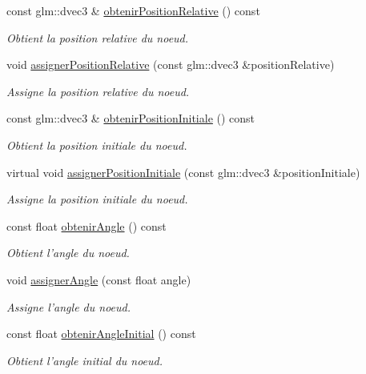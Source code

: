 \begin{DoxyCompactItemize}
const glm\-::dvec3 \& \hyperlink{group__inf2990_ga62d73f67c3b33e2cb106630bd1736a58}{obtenir\-Position\-Relative} () const 
\begin{DoxyCompactList}\small\item\em Obtient la position relative du noeud. \end{DoxyCompactList}\item 
void \hyperlink{group__inf2990_ga11e12e42b05a5327c92cd7fd1b7e5a24}{assigner\-Position\-Relative} (const glm\-::dvec3 \&position\-Relative)
\begin{DoxyCompactList}\small\item\em Assigne la position relative du noeud. \end{DoxyCompactList}\item 
const glm\-::dvec3 \& \hyperlink{group__inf2990_ga5e57e4e6ac1df01d25098fbeb7fcc56d}{obtenir\-Position\-Initiale} () const 
\begin{DoxyCompactList}\small\item\em Obtient la position initiale du noeud. \end{DoxyCompactList}\item 
virtual void \hyperlink{group__inf2990_ga18ba04a32eaa8942418950a647e5e717}{assigner\-Position\-Initiale} (const glm\-::dvec3 \&position\-Initiale)
\begin{DoxyCompactList}\small\item\em Assigne la position initiale du noeud. \end{DoxyCompactList}\item 
const float \hyperlink{group__inf2990_ga9f5f0864e56b552efe95e693c198a3b4}{obtenir\-Angle} () const 
\begin{DoxyCompactList}\small\item\em Obtient l'angle du noeud. \end{DoxyCompactList}\item 
void \hyperlink{group__inf2990_ga7977957d758ca590a057aa33d76e5e75}{assigner\-Angle} (const float angle)
\begin{DoxyCompactList}\small\item\em Assigne l'angle du noeud. \end{DoxyCompactList}\item 
const float \hyperlink{group__inf2990_ga61797fb6a426150891203ea91e3f2cb8}{obtenir\-Angle\-Initial} () const 
\begin{DoxyCompactList}\small\item\em Obtient l'angle initial du noeud. \end{DoxyCompactList}\item 

\end{DoxyCompactItemize}
